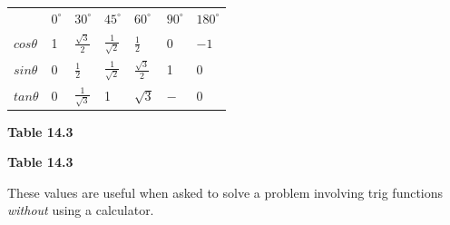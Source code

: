           \begin{table}
        \begin{center}
      \label{m39408*id80733}
    \noindent
      \tablelasttail{}
      \begin{xtabular}[t]{|l|l|l|l|l|l|l|}\hline
         &
                ${0}^{\circ }$
               &
                ${30}^{\circ }$
               &
                ${45}^{\circ }$
               &
                ${60}^{\circ }$
               &
                ${90}^{\circ }$
               &
                ${180}^{\circ }$
     \tabularnewline{}
                $cos\theta $
               &
        1 &
                $\frac{\sqrt{3}}{2}$
               &
                $\frac{1}{\sqrt{2}}$
               &
                $\frac{1}{2}$
               &
        0 &
                $-1$
     \tabularnewline{}
                $sin\theta $
               &
        0 &
                $\frac{1}{2}$
               &
                $\frac{1}{\sqrt{2}}$
               &
                $\frac{\sqrt{3}}{2}$
               &
        1 &
        0%
     \tabularnewline{}
                $tan\theta $
               &
        0 &
                $\frac{1}{\sqrt{3}}$
               &
        1 &
                $\sqrt{3}$
               &
                $-$
               &
        0%
     \tabularnewline{}
    \end{xtabular}
      \end{center}
    \begin{center}{\small\bfseries Table 14.3}\end{center}
    \begin{caption}{\small\bfseries Table 14.3}\end{caption}
\end{table}
    \par
      \label{m39408*id81112}These values are useful when asked to solve a problem involving trig functions \textsl{without} using a calculator.\par 
